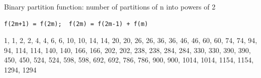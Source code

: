 Binary partition function: number of partitions of n into powers of 2
\begin{verbatim}
f(2m+1) = f(2m);  f(2m) = f(2m-1) + f(m)
\end{verbatim}
1, 1, 2, 2, 4, 4, 6, 6, 10, 10, 14, 14, 20, 20, 26, 26, 36, 36, 46, 46, 60, 60, 74, 74, 94, 94, 114, 114, 140, 140, 166, 166, 202, 202, 238, 238, 284, 284, 330, 330, 390, 390, 450, 450, 524, 524, 598, 598, 692, 692, 786, 786, 900, 900, 1014, 1014, 1154, 1154, 1294, 1294
